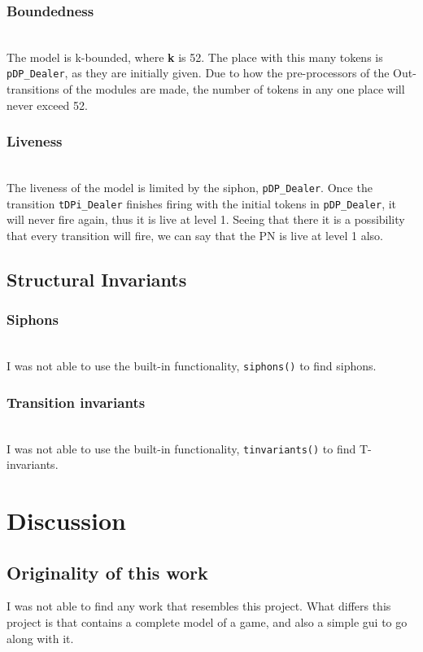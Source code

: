 \documentclass[runningheads,a4paper]{llncs}
\begin{document}
\subsubsection{Boundedness}~\\
The model is k-bounded, where \textbf{k} is 52. The place with this many tokens is \verb!pDP_Dealer!, as they are initially given. Due to how the pre-processors of the Out-transitions of the modules are made, the number of tokens in any one place will never exceed 52.
\subsubsection{Liveness}~\\
The liveness of the model is limited by the siphon, \verb!pDP_Dealer!. Once the transition \verb!tDPi_Dealer! finishes firing with the initial tokens in \verb!pDP_Dealer!, it will never fire again, thus it is live at level 1. Seeing that there it is a possibility that every transition will fire, we can say that the PN is live at level 1 also.
\subsection{Structural Invariants}
\label{sec:4_structural_invariants}
\subsubsection{Siphons}~\\
\label{sec:4_siphons}
I was not able to use the built-in functionality, \verb!siphons()! to find siphons.
\subsubsection{Transition invariants}~\\
\label{sec:4_t_invariants}
I was not able to use the built-in functionality, \verb!tinvariants()! to find T-invariants.
\section{Discussion}
\subsection{Originality of this work}
I was not able to find any work that resembles this project. What differs this project is that contains a complete model of a game, and also a simple \ac{gui} to go along with it.
\end{document}
